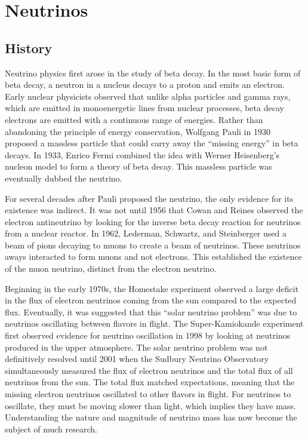 \documentclass[herrin-thesis.tex]{subfiles}
\begin{document}
\chapter{Neutrinos}
\label{ch:neutrinos}

\section{History}
Neutrino physics first arose in the study of beta decay. In the most basic form of beta decay, a neutron in a nucleus decays to a proton and emits an electron. Early nuclear physicists observed that unlike alpha particles and gamma rays, which are emitted in monoenergetic lines from nuclear processes, beta decay electrons are emitted with a continuous range of energies. Rather than abandoning the principle of energy conservation, Wolfgang Pauli in 1930 proposed a massless particle that could carry away the ``missing energy'' in beta decays. In 1933, Enrico Fermi \cite{Fermi:1934bh} combined the idea with Werner Heisenberg's nucleon model to form a theory of beta decay. This massless particle was eventually dubbed the neutrino.

For several decades after Pauli proposed the neutrino, the only evidence for its existence was indirect. It was not until 1956 that Cowan and Reines \cite{Cowan:1956qf} observed the electron antineutrino by looking for the inverse beta decay reaction for neutrinos from a nuclear reactor. In 1962, Lederman, Schwartz, and Steinberger \cite{Danby:1962ve} used a beam of pions decaying to muons to create a beam of neutrinos. These neutrinos aways interacted to form muons and not electrons. This established the existence of the muon neutrino, distinct from the electron neutrino.

Beginning in the early 1970s, the Homestake experiment \cite{Cleveland:1998ly} observed a large deficit in the flux of electron neutrinos coming from the sun compared to the expected flux. Eventually, it was suggested that this ``solar neutrino problem'' was due to neutrinos oscillating between flavors in flight. The Super-Kamiokande experiment first observed evidence for neutrino oscillation in 1998 \cite{Fukuda:1998zr} by looking at neutrinos produced in the upper atmosphere. The solar neutrino problem was not definitively resolved until 2001 when the Sudbury Neutrino Observatory \cite{Ahmad:2001ys} simultaneously measured the flux of electron neutrinos and the total flux of all neutrinos from the sun. The total flux matched expectations, meaning that the missing electron neutrinos oscillated to other flavors in flight. For neutrinos to oscillate, they must be moving slower than light, which implies they have mass. Understanding the nature and magnitude of neutrino mass has now become the subject of much research.
\end{document}
